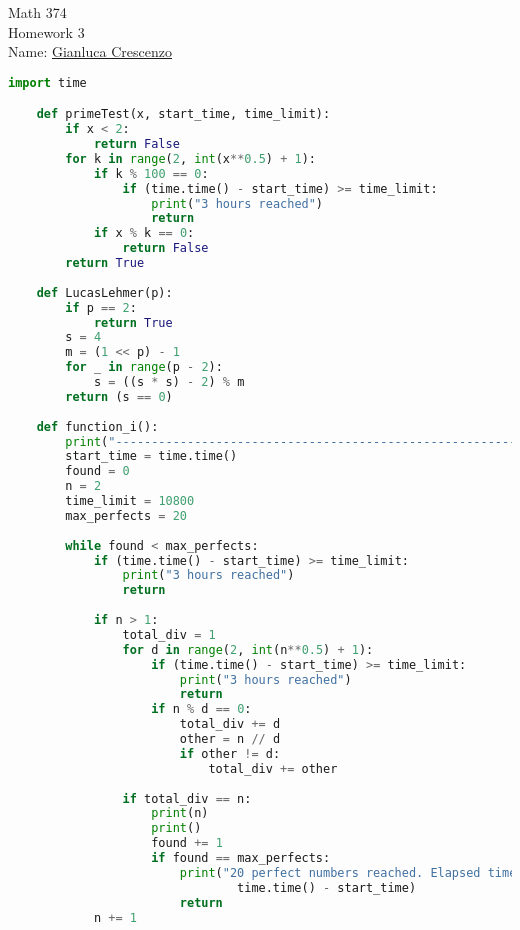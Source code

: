 \documentclass[11pt,twoside,openany]{memoir}
\begin{document}
\begin{center}
{\large Math 374 \\[0.1in]Homework 3 \\[0.1in]}
{Name:} {\underline{Gianluca Crescenzo\hspace*{2in}}}\\[0.15in]
\end{center}
\vspace{4pt}
\begin{lstlisting}[language=Python, basicstyle=\ttfamily\tiny,]
    import time

    def primeTest(x, start_time, time_limit):
        if x < 2:
            return False
        for k in range(2, int(x**0.5) + 1):
            if k % 100 == 0:
                if (time.time() - start_time) >= time_limit:
                    print("3 hours reached")
                    return 
            if x % k == 0:
                return False
        return True
    
    def LucasLehmer(p):
        if p == 2:
            return True
        s = 4
        m = (1 << p) - 1
        for _ in range(p - 2):
            s = ((s * s) - 2) % m
        return (s == 0)
    
    def function_i():
        print("----------------------------------------------------------------")
        start_time = time.time()
        found = 0
        n = 2
        time_limit = 10800 
        max_perfects = 20
    
        while found < max_perfects:
            if (time.time() - start_time) >= time_limit:
                print("3 hours reached")
                return
            
            if n > 1:
                total_div = 1
                for d in range(2, int(n**0.5) + 1):
                    if (time.time() - start_time) >= time_limit:
                        print("3 hours reached")
                        return
                    if n % d == 0:
                        total_div += d
                        other = n // d
                        if other != d:
                            total_div += other
    
                if total_div == n:
                    print(n)
                    print()
                    found += 1
                    if found == max_perfects:
                        print("20 perfect numbers reached. Elapsed time:",
                                time.time() - start_time)
                        return
            n += 1
    

\end{lstlisting}
\end{document}

